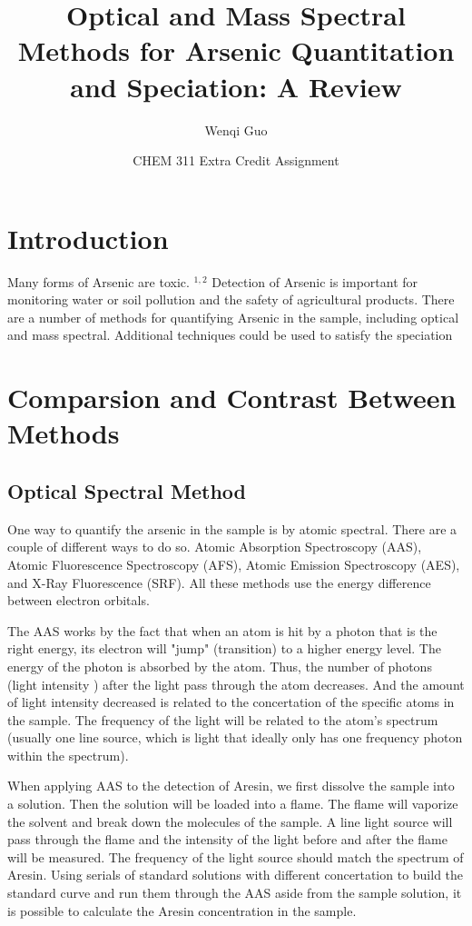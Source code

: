 \documentclass[12pt]{article}
\begin{document}
\date{CHEM 311 Extra Credit Assignment}
\author{Wenqi Guo}
\title{Optical and Mass Spectral Methods for Arsenic Quantitation and Speciation: A Review} 
\maketitle
\section{Introduction}
Many forms of Arsenic are toxic. $^{1,2}$ Detection of Arsenic is important for monitoring water or soil pollution and the safety of agricultural products. There are a number of methods for quantifying Arsenic in the sample, including optical and mass spectral. Additional techniques could be used to satisfy the speciation 
\section{Comparsion and Contrast Between Methods}
\subsection{Optical Spectral Method}
One way to quantify the arsenic in the sample is by atomic spectral. There are a couple of different ways to do so. Atomic Absorption Spectroscopy (AAS), Atomic Fluorescence Spectroscopy (AFS), Atomic Emission Spectroscopy (AES), and X-Ray Fluorescence (SRF). All these methods use the energy difference between electron orbitals. 

The AAS works by the fact that when an atom is hit by a photon that is the right energy, its electron will "jump" (transition) to a higher energy level. The energy of the photon is absorbed by the atom. Thus, the number of photons (light intensity ) after the light pass through the atom decreases. And the amount of light intensity decreased is related to the concertation of the specific atoms in the sample. The frequency of the light will be related to the atom's spectrum (usually one line source, which is light that ideally only has one frequency photon within the spectrum). 

When applying AAS to the detection of Aresin, we first dissolve the sample into a solution. Then the solution will be loaded into a flame. The flame will vaporize the solvent and break down the molecules of the sample. A line light source will pass through the flame and the intensity of the light before and after the flame will be measured. The frequency of the light source should match the spectrum of Aresin. Using serials of standard solutions with different concertation to build the standard curve and run them through the AAS aside from the sample solution, it is possible to calculate the Aresin concentration in the sample.
\end{document}
